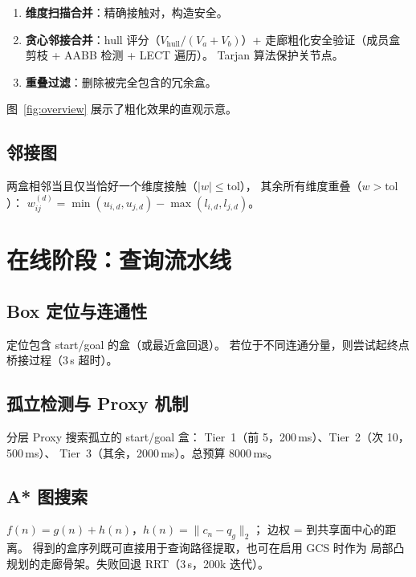 \documentclass[journal]{IEEEtran}
\begin{document}
\begin{enumerate}[nosep]
  \item \textbf{维度扫描合并}：精确接触对，构造安全。
  \item \textbf{贪心邻接合并}：hull 评分（$V_\text{hull}/(V_a+V_b)$）+
    走廊粗化安全验证（成员盒剪枝 + AABB 检测 + LECT 遍历）。
    Tarjan 算法保护关节点。
  \item \textbf{重叠过滤}：删除被完全包含的冗余盒。
\end{enumerate}

图~\ref{fig:overview} 展示了粗化效果的直观示意。

\subsection{邻接图}

两盒相邻当且仅当恰好一个维度接触（$|w| \leq \text{tol}$），
其余所有维度重叠（$w > \text{tol}$）：
$w_{ij}^{(d)} = \min(u_{i,d}, u_{j,d}) - \max(l_{i,d}, l_{j,d})$。

\section{在线阶段：查询流水线}\label{sec:query}

\subsection{Box 定位与连通性}

定位包含 start/goal 的盒（或最近盒回退）。
若位于不同连通分量，则尝试起终点桥接过程（3\,s 超时）。

\subsection{孤立检测与 Proxy 机制}

分层 Proxy 搜索孤立的 start/goal 盒：
Tier~1（前 5，200\,ms）、Tier~2（次 10，500\,ms）、
Tier~3（其余，2000\,ms）。总预算 8000\,ms。

\subsection{A* 图搜索}

$f(n) = g(n) + h(n)$，$h(n) = \|c_n - q_g\|_2$；
边权 = 到共享面中心的距离。
得到的盒序列既可直接用于查询路径提取，也可在启用 GCS 时作为
局部凸规划的走廊骨架。失败回退 RRT（3\,s，200k 迭代）。
\end{document}
